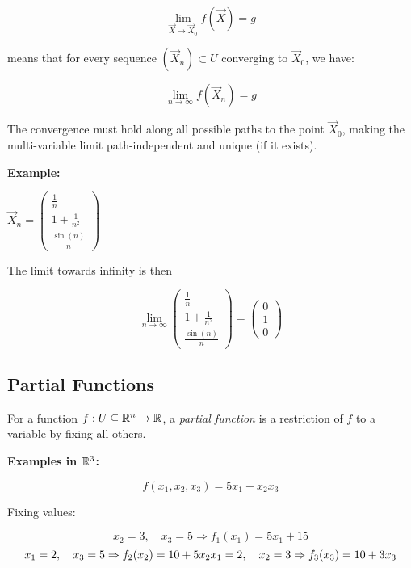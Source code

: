 \[
    \lim_{\vec{X} \to \vec{X}_0} f(\vec{X}) = g
\]

means that for every sequence \( (\vec{X}_n) \subset U \) converging to \( \vec{X}_0 \), we have:

\[
    \lim_{n \to \infty} f(\vec{X}_n) = g
\]

The convergence must hold along all possible paths to the point \( \vec{X}_0 \), making the 
multi-variable limit path-independent and unique (if it exists).
\vspace{\baselineskip}

\textbf{Example:}
\vspace{\baselineskip}

\(\vec{X}_n = \begin{pmatrix} \frac{1}{n} \\ 1 + \frac{1}{n^2} \\ \frac{\sin(n)}{n} \end{pmatrix}\)
\vspace{\baselineskip}

The limit towards infinity is then 

\[
    \lim_{n \to \infty} \begin{pmatrix} \frac{1}{n} \\ 1 + \frac{1}{n^2} \\ \frac{\sin(n)}{n} \end{pmatrix}
    = \begin{pmatrix}
        0 \\ 1 \\ 0
    \end{pmatrix}
\]

\subsection{Partial Functions}

For a function \( f: U \subseteq \mathbb{R}^n \to \mathbb{R} \), a \emph{partial function} is a 
restriction of \( f \) to a variable by fixing all others.
\vspace{\baselineskip}

\textbf{Examples in \( \mathbb{R}^3 \):}

\[
    f(x_1, x_2, x_3) = 5x_1 + x_2 x_3
\]

Fixing values:

\[
    x_2 = 3, \quad x_3 = 5 \Rightarrow f_1(x_1) = 5x_1 + 15 
\]
\[
    x_1 = 2, \quad x_3 = 5 \Rightarrow f_2(x_2) = 10 + 5x_2 \\
    x_1 = 2, \quad x_2 = 3 \Rightarrow f_3(x_3) = 10 + 3x_3
\]

